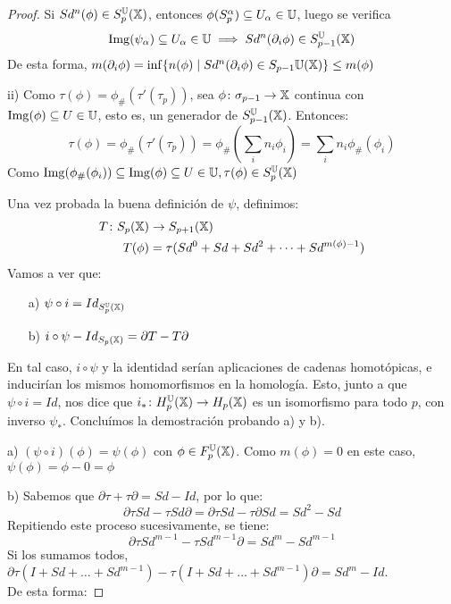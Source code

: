 \begin{proof}
  Si $Sd^n(\phi) \in S_p^{\mathbb U}({\mathbb X})$, entonces $\phi(S_p^\alpha) \subseteq U_\alpha \in {\mathbb U}$, luego se verifica
  \[ \operatorname{Img}(\psi_\alpha) \subseteq U_\alpha \in {\mathbb U} \implies Sd^n(\partial_i \phi) \in S_{p-1}^{\mathbb U}({\mathbb X}) \]
  De esta forma, $m(\partial_i \phi) = \inf\{n(\phi) \mid Sd^n(\partial_i \phi) \in S_{p-1}{\mathbb U}({\mathbb X})\} \leq m(\phi)$

  ii) Como $\tau(\phi) = \phi_\# (\tau'(\tau_p))$, sea $\phi \colon \sigma_{p-1} \to {\mathbb X}$ continua con $\operatorname{Img}(\phi) \subseteq U \in {\mathbb U}$, esto es,
  un generador de $S_{p-1}^{\mathbb U}({\mathbb X})$. Entonces:
  \[ \tau(\phi) = \phi_\#(\tau'(\tau_p)) = \phi_\#(\sum_i n_i \phi_i) = \sum_i n_i \phi_\#(\phi_i) \]
  Como $\operatorname{Img}(\phi_\#(\phi_i)) \subseteq \operatorname{Img}(\phi) \subseteq U \in {\mathbb U}, \tau(\phi) \in S_p^{\mathbb U}({\mathbb X})$

  Una vez probada la buena definición de $\psi$, definimos:
  \begin{align*}
    T \colon S_p({\mathbb X}) &\to S_{p+1}({\mathbb X})  \\
    T(\phi) &= \tau(Sd^0 + Sd + Sd^2 + \dots + Sd^{m(\phi) - 1})
  \end{align*}
  Vamos a ver que:
  \begin{itemize}
    \item[a)] $\psi \circ i = Id_{S_p^{\mathbb U}({\mathbb X})}$
    \item[b)] $i \circ \psi - Id_{S_{p}({\mathbb X})} = \partial T - T \partial$
  \end{itemize}
  En tal caso, $i \circ \psi$ y la identidad serían aplicaciones de cadenas homotópicas, e inducirían los mismos homomorfismos en la homología.
  Esto, junto a que $\psi \circ i = Id$, nos dice que $i_* \colon H_p^{{\mathbb U}}({\mathbb X}) \to H_p({\mathbb X})$ es un isomorfismo para todo $p$, con inverso $\psi_*$.
  Concluímos la demostración probando a) y b).

  a) $(\psi \circ i)(\phi) = \psi(\phi)$ con $\phi \in F_p^{\mathbb U}({\mathbb X})$. Como $m(\phi) = 0$ en este caso, $\psi(\phi) = \phi - 0 = \phi$

  b) Sabemos que $\partial \tau + \tau \partial = Sd - Id$, por lo que:
  \[ \partial \tau Sd - \tau Sd \partial = \partial \tau Sd - \tau \partial Sd = Sd^2 - Sd \]
  Repitiendo este proceso sucesivamente, se tiene:
  \[ \partial \tau Sd^{m - 1} - \tau Sd^{m-1} \partial = Sd^m - Sd^{m-1} \]
  Si los sumamos todos, $\partial \tau(I + Sd + \dots + Sd^{m-1}) - \tau(I + Sd + \dots + Sd^{m-1}) \partial = Sd^m - Id$. \\
  De esta forma:


\end{proof}
